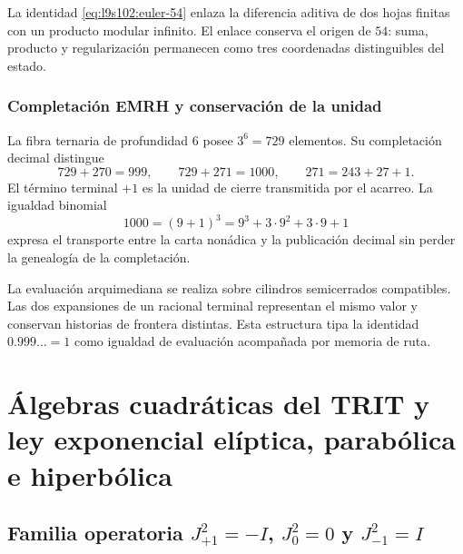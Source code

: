 La identidad \cref{eq:l9s102:euler-54} enlaza la diferencia aditiva de dos
hojas finitas con un producto modular infinito. El enlace conserva el
origen de \(54\): suma, producto y regularización permanecen como tres
coordenadas distinguibles del estado.

\subsubsection{Completación EMRH y conservación de la unidad}
\label{sec:l9s102:euler-emrh}

La fibra ternaria de profundidad \(6\) posee \(3^6=729\) elementos. Su
completación decimal distingue
\begin{equation}
 729+270=999,
 \qquad
 729+271=1000,
 \qquad
 271=243+27+1.
 \label{eq:l9s102:euler-729-1000}
\end{equation}
El término terminal \(+1\) es la unidad de cierre transmitida por el
acarreo. La igualdad binomial
\begin{equation}
 1000=(9+1)^3=9^3+3\cdot9^2+3\cdot9+1
 \label{eq:l9s102:euler-binomial-1000}
\end{equation}
expresa el transporte entre la carta nonádica y la publicación decimal sin
perder la genealogía de la completación.

La evaluación arquimediana se realiza sobre cilindros semicerrados
compatibles. Las dos expansiones de un racional terminal representan el
mismo valor y conservan historias de frontera distintas. Esta estructura
tipa la identidad \(0.999\ldots=1\) como igualdad de evaluación acompañada
por memoria de ruta.

\section{Álgebras cuadráticas del TRIT y ley exponencial elíptica, parabólica e hiperbólica}
\label{sec:l9s102:euler-algebras-trit}

\subsection{Familia operatoria \texorpdfstring{\(J_{+1}^2=-I\), \(J_0^2=0\) y \(J_{-1}^2=I\)}{J+1^2=-I, J0^2=0 y J-1^2=I}}

